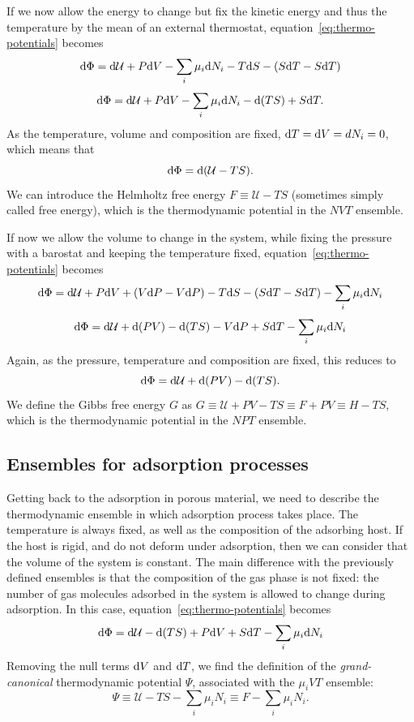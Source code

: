 \documentclass[thesis]{subfiles}
\begin{document}
If we now allow the energy to change but fix the kinetic energy and thus the
temperature by the mean of an external thermostat,
equation~\eqref{eq:thermo-potentials} becomes
\[\text{d} \Phi = \text{d} \mathcal{U} + P \text{d} V - \sum_i \mu_i \text{d} N_i - T \text{d} S - (S \text{d} T - S \text{d} T) \]
\[\text{d} \Phi = \text{d} \mathcal{U} + P \text{d} V - \sum_i \mu_i \text{d} N_i - \text{d} (TS) + S \text{d} T. \]
As the temperature, volume and composition are fixed, $\text{d} T = \text{d} V = d N_i = 0$,
which means that
\[\text{d} \Phi = \text{d} (\mathcal{U} - TS).\]
We can introduce the Helmholtz free energy $F \equiv \mathcal{U} - TS$
(sometimes simply called free energy), which is the thermodynamic potential in
the $NVT$ ensemble.

If now we allow the volume to change in the system, while fixing the pressure
with a barostat and keeping the temperature fixed,
equation~\eqref{eq:thermo-potentials} becomes
\[\text{d} \Phi = \text{d} \mathcal{U} + P \text{d} V + (V\text{d} P - V\text{d} P) - T \text{d} S - (S\text{d} T - S\text{d} T) - \sum_i \mu_i \text{d} N_i\]
\[\text{d} \Phi = \text{d} \mathcal{U} + \text{d} (PV) - \text{d}(TS) - V\text{d} P + S\text{d} T - \sum_i \mu_i \text{d} N_i\]
Again, as the pressure, temperature and composition are fixed, this reduces to
\[\text{d} \Phi = \text{d} \mathcal{U} + \text{d} (PV) - \text{d}(TS).\]
We define the Gibbs free energy $G$ as $G \equiv \mathcal{U} + PV - TS \equiv F + PV
\equiv H - TS$, which is the thermodynamic potential in the $NPT$ ensemble.

\subsection{Ensembles for adsorption processes}
\label{sec:osmotic-ensemble}

Getting back to the adsorption in porous material, we need to describe the
thermodynamic ensemble in which adsorption process takes place. The temperature
is always fixed, as well as the composition of the adsorbing host. If the host
is rigid, and do not deform under adsorption, then we can consider that the
volume of the system is constant. The main difference with the previously
defined ensembles is that the composition of the gas phase is not fixed:
the number of gas molecules adsorbed in the system is allowed to change during
adsorption. In this case, equation~\eqref{eq:thermo-potentials} becomes
\[\text{d} \Phi = \text{d} \mathcal{U} - \text{d}(TS) + P\text{d} V + S\text{d} T - \sum_i \mu_i \text{d} N_i\]
Removing the null terms $\text{d} V$ and $\text{d} T$, we find the definition of the
\emph{grand-canonical} thermodynamic potential $\Psi$, associated with the
$\mu_iVT$ ensemble:
\[\Psi \equiv \mathcal{U} - TS - \sum_i \mu_i N_i \equiv F - \sum_i \mu_i N_i.\]
\end{document}

